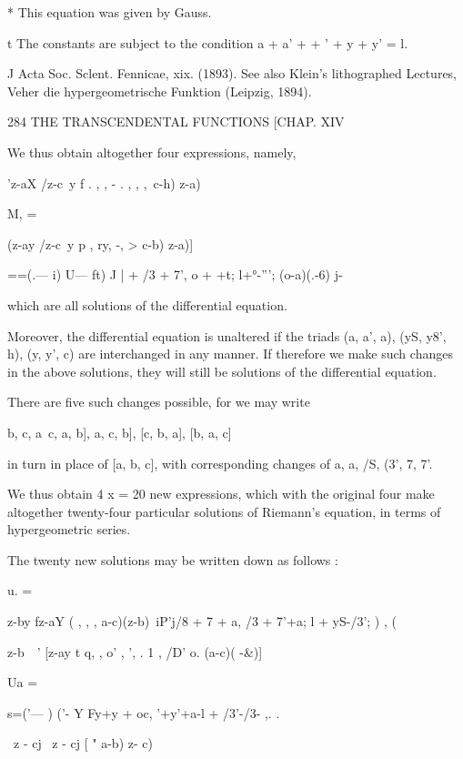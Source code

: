 * This equation was given by Gauss.

t The constants are subject to the condition a + a' + + ' + y + y' =
l.

J Acta Soc. Sclent. Fennicae, xix. (1893). See also Klein's
lithographed Lectures, Veher die hypergeometrische Funktion (Leipzig,
1894).



284 THE TRANSCENDENTAL FUNCTIONS [CHAP. XIV

We thus obtain altogether four expressions, namely,

'z-aX /z-c\ y f . , , - . , , ,\ c-h) z-a)\



M, =



(z-ay /z-c\ y p , ry, -, > c-b) z-a)]

 ==(.— i) U— ft) J | + /3 + 7', o + +t; l+°-'''; (o-a)(.-6) j-

which are all solutions of the differential equation.

Moreover, the differential equation is unaltered if the triads (a, a',
a), (yS, y8', h), (y, y', c) are interchanged in any manner. If
therefore we make such changes in the above solutions, they will still
be solutions of the differential equation.

There are five such changes possible, for we may write

 b, c, a\, c, a, b], a, c, b], [c, b, a], [b, a, c]

in turn in place of [a, b, c], with corresponding changes of a, a, /S,
(3', 7, 7'.

We thus obtain 4 x = 20 new expressions, which with the original four
make altogether twenty-four particular solutions of Riemann's
equation, in terms of hypergeometric series.

The twenty new solutions may be written down as follows :



u. =



z-by fz-aY ( , , , a-c)(z-b)\ iP'j/8 + 7 + a, /3 + 7'+a; l + yS-/3'; )
, (

z-b\ \ ' [z-ay t q, , o' , ', . 1 , /D' o. (a-c)( -\&)]



Ua =



 s=('— ) ('- Y Fy+y + oc, '+y'+a-l + /3'-/3- ,. .

\ z - cj \ z - cj [ " a-b) z- c)

